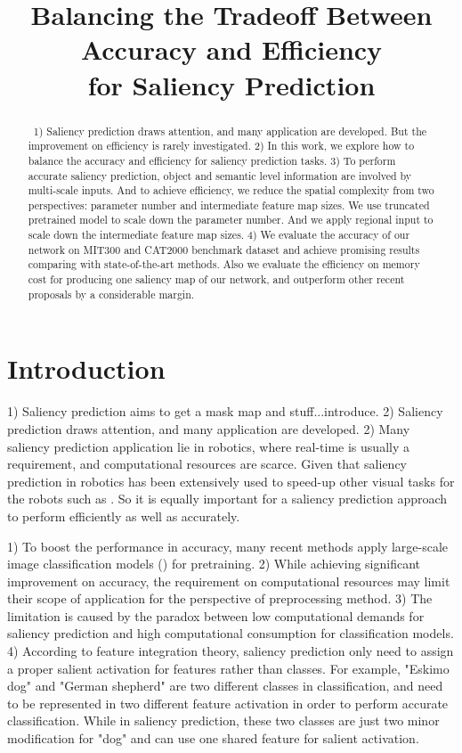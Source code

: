 \documentclass[twoside,twocolumn]{article}
\date{}
\title{Balancing the Tradeoff Between Accuracy and Efficiency\\ for Saliency Prediction}
\author{%
}
\begin{document}
\maketitle
\begin{abstract}\
1) Saliency prediction draws attention, and many application are developed. But the improvement on efficiency is rarely investigated. 2) In this work, we explore how to balance the accuracy and efficiency for saliency prediction tasks. 3) To perform accurate saliency prediction, object and semantic level information are involved by multi-scale inputs. And to achieve efficiency, we reduce the spatial complexity from two perspectives: parameter number and intermediate feature map sizes. We use truncated pretrained model to scale down the parameter number. And we apply regional input to scale down the intermediate feature map sizes. 4) We evaluate the accuracy of our network on MIT300 and CAT2000 benchmark dataset and achieve promising results comparing with state-of-the-art methods. Also we evaluate the efficiency on memory cost for producing one saliency map of our network, and outperform other recent proposals by a considerable margin.

\end{abstract}

\section{Introduction}

\par 1) Saliency prediction aims to get a mask map and stuff...introduce. 2) Saliency prediction draws attention, and many application are developed. 2) Many saliency prediction application lie in robotics, where real-time is usually a requirement, and computational resources are scarce. Given that saliency prediction in robotics has been extensively used to speed-up other visual tasks for the robots such as \cite{borji2010online,dankers2007reactive}. So it is equally important for a saliency prediction approach to perform efficiently as well as accurately.

\par 1) To boost the performance in accuracy, many recent methods apply large-scale image classification models (\cite{Simonyan14c,szegedy2015going,krizhevsky2012imagenet}) for pretraining. 2) While achieving significant improvement on accuracy, the requirement on computational resources may limit their scope of application for the perspective of preprocessing method. 3) The limitation is caused by the paradox between low computational demands for saliency prediction and high computational consumption for classification models. 4) According to feature integration theory, saliency prediction only need to assign a proper salient activation for features rather than classes. For example, "Eskimo dog" and "German shepherd" are two different classes in classification, and need to be represented in two different feature activation in order to perform accurate classification. While in saliency prediction, these two classes are just two minor modification for "dog" and can use one shared feature for salient activation.
\end{document}
